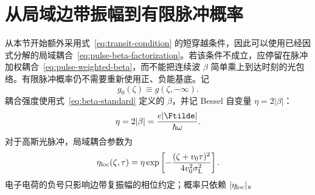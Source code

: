 \section{从局域边带振幅到有限脉冲概率}

从本节开始额外采用式~\eqref{eq:transit-condition} 的短穿越条件，因此可以使用已经因式分解的局域耦合~\eqref{eq:pulse-beta-factorization}。若该条件不成立，应停留在脉冲加权耦合~\eqref{eq:pulse-weighted-beta}，而不能把连续波 $\beta$ 简单乘上到达时刻的光包络。有限脉冲概率仍不需要重新使用正、负能基底。记
\[
g_0(\zeta)\equiv g(\zeta,-\infty).
\]
耦合强度使用式~\eqref{eq:beta-standard} 定义的 $\beta$，并记 Bessel 自变量 $\eta=2|\beta|$：
\[
\eta=2|\beta|=\frac{e|\Ftilde|}{\hbar\omega}.
\]
对于高斯光脉冲，局域耦合参数为
\begin{equation}
\eta_{\rm loc}(\zeta,\tau)
=
\eta
\exp\left[
-\frac{(\zeta+v_0\tau)^2}
{4v_0^2\sigma_{\mathrm L}^2}
\right].
\label{eq:eta-local}
\end{equation}
电子电荷的负号只影响边带复振幅的相位约定；概率只依赖 $|\eta_{\rm loc}|$。

